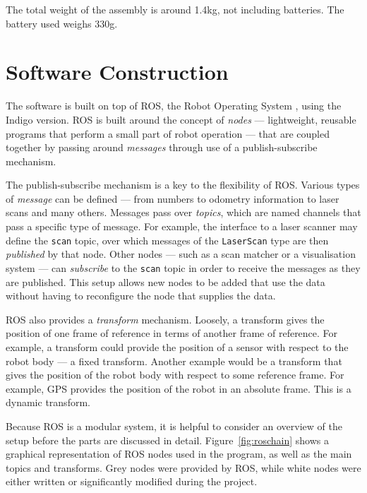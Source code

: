 \documentclass[12pt,oneside,a4paper]{book}
\begin{document}
The total weight of the assembly is around 1.4kg, not including
batteries. The battery used weighs 330g.
\newpage
\section{Software Construction}
\label{sec:software}

The software is built on top of ROS, the Robot Operating System
\cite{rosos}, using the Indigo version. ROS is built around the
concept of \emph{nodes} --- lightweight, reusable programs that
perform a small part of robot operation --- that are coupled together
by passing around \emph{messages} through use of a publish-subscribe
mechanism.

The publish-subscribe mechanism is a key to the flexibility of
ROS. Various types of \emph{message} can be defined --- from numbers to
odometry information to laser scans and many others. Messages pass
over \emph{topics}, which are named channels that pass a specific type
of message. For example, the interface to a laser scanner may define
the \texttt{scan} topic, over which messages of the \texttt{LaserScan}
type are then \emph{published} by that node. Other nodes --- such as
a scan matcher or a visualisation system --- can \emph{subscribe} to
the \texttt{scan} topic in order to receive the messages as they are
published. This setup allows new nodes to be added that use the
data without having to reconfigure the node that supplies the data.

ROS also provides a \emph{transform} mechanism. Loosely, a transform
gives the position of one frame of reference in terms of another frame
of reference. For example, a transform could provide the position of a
sensor with respect to the robot body --- a fixed transform. Another
example would be a transform that gives the position of the robot body with
respect to some reference frame. For example, GPS provides the
position of the robot in an absolute frame. This is a dynamic transform.

Because ROS is a modular system, it is helpful to consider an
overview of the setup before the parts are discussed in
detail. Figure~\ref{fig:roschain} shows a graphical representation of
ROS nodes used in the program, as well as the main topics and
transforms. Grey nodes were provided by ROS, while white nodes were
either written or significantly modified during the project.
\end{document}
